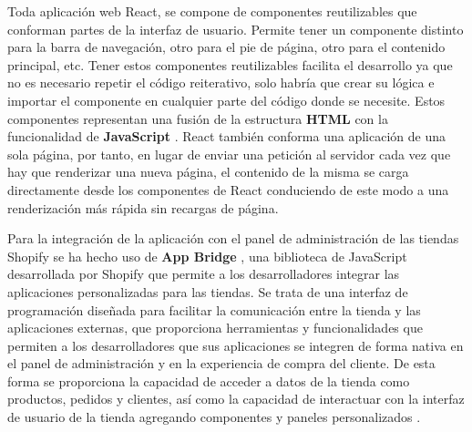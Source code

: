 \documentclass[12pt]{article}
\begin{document}
Toda aplicación web React, se compone de componentes reutilizables que conforman partes de la interfaz de usuario. Permite tener un componente distinto para
la barra de navegación, otro para el pie de página, otro para el contenido principal, etc.
Tener estos componentes reutilizables facilita el desarrollo ya que no es necesario repetir el código reiterativo, solo habría que crear su lógica e
importar el componente en cualquier parte del código donde se necesite. Estos componentes representan una fusión de la estructura \textbf{HTML} \cite{html} con la funcionalidad de \textbf{JavaScript} \cite{javascript}.
React también conforma una aplicación de una sola página, por tanto, en lugar de enviar una petición al servidor cada vez que hay que renderizar una nueva página,
el contenido de la misma se carga directamente desde los componentes de React conduciendo de este modo a una renderización más rápida sin recargas de página. \cite{react-pag-2}

Para la integración de la aplicación con el panel de administración de las tiendas Shopify se ha hecho uso de \textbf{App Bridge} \cite{app-bridge}, una biblioteca de JavaScript
desarrollada por Shopify que permite a los desarrolladores integrar las aplicaciones personalizadas para las tiendas. Se trata de una interfaz
de programación diseñada para facilitar la comunicación entre la tienda y las aplicaciones externas, que proporciona herramientas y funcionalidades
que permiten a los desarrolladores que sus aplicaciones se integren de forma nativa en el panel de administración y en la experiencia de compra
del cliente. De esta forma se proporciona la capacidad de acceder a datos de la tienda como productos, pedidos y clientes, así como la capacidad de interactuar con la interfaz
de usuario de la tienda agregando componentes y paneles personalizados \cite{shopify-dev}. 
\end{document}
